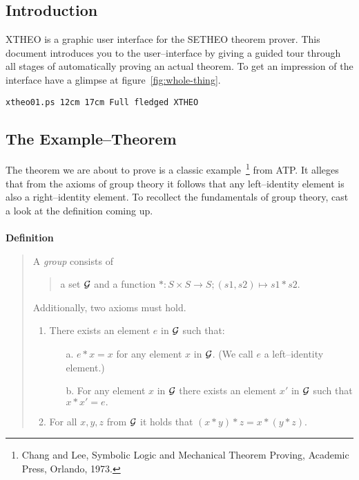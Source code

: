 %

\newcommand\bild[5]{{\tt #1 #2 #3 #4 }\label{#5}}

\subsection{Introduction} 
XTHEO is a graphic user interface for the SETHEO theorem prover.
This document introduces you to the user--interface by giving a 
guided tour through all stages of automatically proving an actual theorem.
To get an impression of the interface have a glimpse at figure~\ref{fig:whole-thing}.

\bild{xtheo01.ps}{12cm}{17cm}{Full fledged XTHEO}{fig:whole-thing}

\subsection{The Example--Theorem} 
The theorem we are about to prove is a classic example~\footnote{Chang and Lee, 
Symbolic Logic and Mechanical Theorem Proving, Academic Press, Orlando, 1973.} from ATP.
It alleges that from the axioms of group theory it follows that any
left--identity element is also a right--identity element. 
To recollect the fundamentals of group theory, cast a look at the definition coming up.
\\ \\
{\bf Definition}
\begin{quote}
A {\it group\/} consists of 
\begin{quote}
a set $\cal G$ 
and 
a function $* : S \times S \rightarrow S; (s1,s2) \mapsto s1 * s2$. 
\end{quote}
Additionally, two axioms must hold.
\begin{enumerate}
\item There exists an element $e$ in $\cal G$ such that: \\
\begin{itemize}
\item[a.]$e * x = x$ for any element $x$ in $\cal G$. 
(We call $e$ a left--identity element.) 
\item[b.] For any element $x$ in $\cal G$ there exists an element $x'$ in $\cal G$ such that 
$x * x' = e.$ \\ 
\end{itemize}
\item For all $x, y, z$ from $\cal G$ it holds that $(x * y) * z = x * (y * z)$.
\end{enumerate}
\end{quote}

